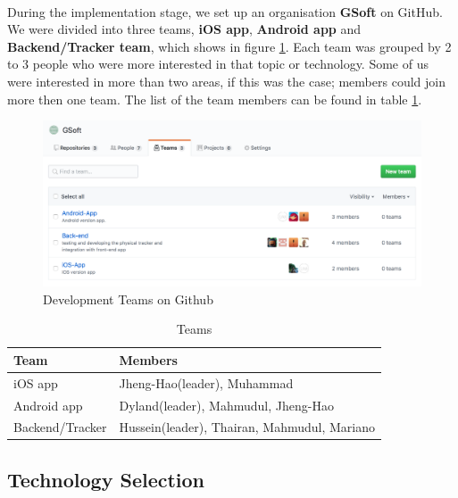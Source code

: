\documentclass[12pt,a4paper]{article}
\begin{document}
        \paragraph{}During the implementation stage, we set up an organisation {\bf GSoft} on GitHub. We were divided into three teams, {\bf iOS app}, {\bf Android app} and {\bf Backend/Tracker team}, which shows in figure \ref{fig:Development Teams}. Each team was grouped by 2 to 3 people who were more interested in that topic or technology. Some of us were interested in more than two areas, if this was the case; members could join more then one team. The list of the team members can be found in table \ref{table:Teams}.
        \begin{figure}[H]
          \centering
          \includegraphics[width=1\textwidth]{../assets/development-records-teams.png}
          \caption{Development Teams on Github}
          \label{fig:Development Teams}
        \end{figure}

        \begin{table}[H]
          \centering
            \begin{tabularx}{\textwidth}{l X}
              \hline
               Team & Members \\ \hline
               iOS app & Jheng-Hao(leader), Muhammad \\
               Android app & Dyland(leader), Mahmudul, Jheng-Hao \\ 
               Backend/Tracker  & Hussein(leader), Thairan, Mahmudul, Mariano \\
              \hline
            \end{tabularx}
            \caption[Table caption text]{Teams}
            \label{table:Teams}
        \end{table}        

      \subsection{Technology Selection} 
\end{document}
